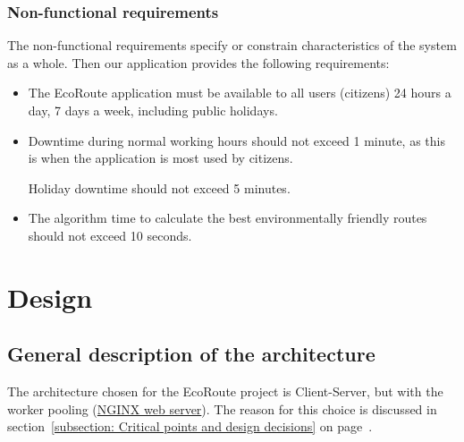 \documentclass[a4paper]{article}
\begin{document}
    \subsubsection{Non-functional requirements}

    The non-functional requirements specify or constrain characteristics of the system as a whole. Then our application provides the following requirements:
    \begin{itemize}
        \item The EcoRoute application must be available to all users (citizens) 24 hours a day, 7 days a week, including public holidays.
        

        \item Downtime during normal working hours should not exceed 1 minute, as this is when the application is most used by citizens.
        
        Holiday downtime should not exceed 5 minutes.

        
        \item The algorithm time to calculate the best environmentally friendly routes should not exceed 10 seconds.
    \end{itemize}

    \newpage

    \section{Design}

    \subsection{General description of the architecture}

    The architecture chosen for the EcoRoute project is Client-Server, but with the worker pooling (\href{https://www.nginx.com/}{NGINX web server}). The reason for this choice is discussed in section~\ref{subsection: Critical points and design decisions} on page~\pageref{subsection: Critical points and design decisions}.

    \hfill
\end{document}
